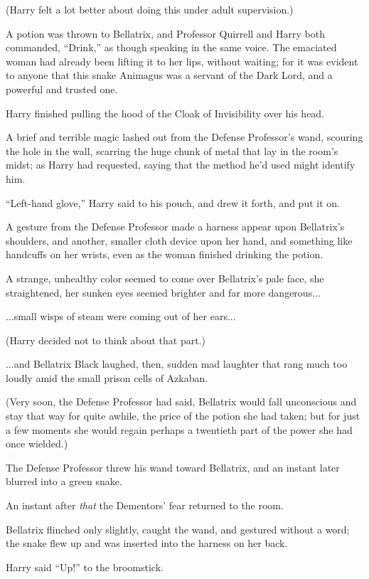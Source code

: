 (Harry felt a lot better about doing this under adult supervision.)

A potion was thrown to Bellatrix, and Professor Quirrell and Harry both commanded, ``Drink,'' as though speaking in the same voice. The emaciated woman had already been lifting it to her lips, without waiting; for it was evident to anyone that this snake Animagus was a servant of the Dark Lord, and a powerful and trusted one.

Harry finished pulling the hood of the Cloak of Invisibility over his head.

A brief and terrible magic lashed out from the Defense Professor's wand, scouring the hole in the wall, scarring the huge chunk of metal that lay in the room's midst; as Harry had requested, saying that the method he'd used might identify him.

``Left-hand glove,'' Harry said to his pouch, and drew it forth, and put it on.

A gesture from the Defense Professor made a harness appear upon Bellatrix's shoulders, and another, smaller cloth device upon her hand, and something like handcuffs on her wrists, even as the woman finished drinking the potion.

A strange, unhealthy color seemed to come over Bellatrix's pale face, she straightened, her sunken eyes seemed brighter and far more dangerous...

...small wisps of steam were coming out of her ears...

(Harry decided not to think about that part.)

...and Bellatrix Black laughed, then, sudden mad laughter that rang much too loudly amid the small prison cells of Azkaban.

(Very soon, the Defense Professor had said, Bellatrix would fall unconscious and stay that way for quite awhile, the price of the potion she had taken; but for just a few moments she would regain perhaps a twentieth part of the power she had once wielded.)

The Defense Professor threw his wand toward Bellatrix, and an instant later blurred into a green snake.

An instant after \emph{that} the Dementors' fear returned to the room.

Bellatrix flinched only slightly, caught the wand, and gestured without a word; the snake flew up and was inserted into the harness on her back.

Harry said ``Up!'' to the broomstick.

